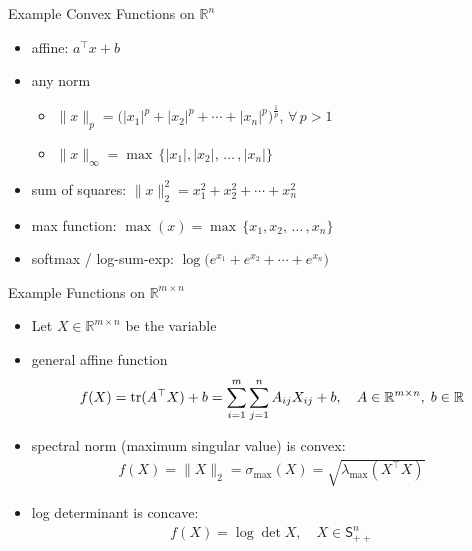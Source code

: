 \documentclass[10pt,handout]{beamer}
\newcommand{\ds}{\displaystyle}
\DeclareMathOperator*{\tr}{tr}
\theoremstyle{definition}
\def\tr{\mathop{\rm tr}}
\begin{document}
\begin{frame}{Example Convex Functions on $\mathbb{R}^n$}
  \begin{itemize}
    \item affine: $\ds a^\top\!x + b$
    \item any norm 
      \begin{itemize}
        \item $\ds\|x\|_p = \big(|x_1|^p + |x_2|^p + \cdots + |x_n|^p\big)^{\frac{1}{p}}$, $\forall\,p > 1$
        \item $\ds\|x\|_\infty = \max\,\{|x_1|, |x_2|,\,\ldots\,,|x_n|\}$
      \end{itemize}
    \item sum of squares: $\ds\|x\|_2^2 = x_1^2 + x_2^2 + \cdots + x_n^2$
    \item max function: $\ds\max(x) = \max\,\{x_1, x_2,\,\ldots\,,x_n\}$
    \item softmax / log-sum-exp: $\ds\log\big(e^{x_1} + e^{x_2} + \cdots + e^{x_n}\big)$
  \end{itemize}
\end{frame}

\begin{frame}{Example Functions on $\mathbb{R}^{m\times n}$}
  \begin{itemize}
    \item Let $\ds X\in\mathbb{R}^{m\times n}$ be the variable
    \item general affine function
      \begin{align*}
        f(X) = \tr(A^\top X) + b = \sum_{i=1}^m\sum_{j=1}^n A_{ij} X_{ij} + b, \quad A\in\mathbb{R}^{m\times n},\;b\in\mathbb{R}
      \end{align*}
    \item spectral norm (maximum singular value) is convex: 
      \begin{align*}
        f(X) = \|X\|_2 = \sigma_{\text{max}}(X) = \sqrt{\lambda_{\text{max}}(X^\top X)}
      \end{align*}
    \item log determinant is concave:
      \begin{align*}
        f(X) = \log\det X, \quad X\in\mathsf{S}^n_{++}
      \end{align*}
  \end{itemize}
\end{frame}
\end{document}
